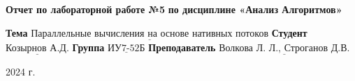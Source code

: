 \begin{titlepage}
	
	\begin{center}
		\noindent\begin{minipage}{1.3\textwidth}\centering
		\Large\textbf{   Отчет по лабораторной работе №5}\newline
		\textbf{по дисциплине «Анализ Алгоритмов»}\newline\newline\newline
		\end{minipage}
	\end{center}
	
	\noindent\textbf{Тема} 			$\underline{\text{Параллельные вычисления на основе нативных потоков}}$\newline\newline
	\noindent\textbf{Студент} 		$\underline{\text{Козырнов А.Д.}}$\newline\newline
	\noindent\textbf{Группа} 		$\underline{\text{ИУ7-52Б}}$\newline\newline
	\noindent\textbf{Преподаватель} $\underline{\text{Волкова Л. Л., Строганов Д.В.}}$\newline
	
	\begin{center}
        \vfill
		2024 г.
	\end{center}
	\restoregeometry
\end{titlepage}
